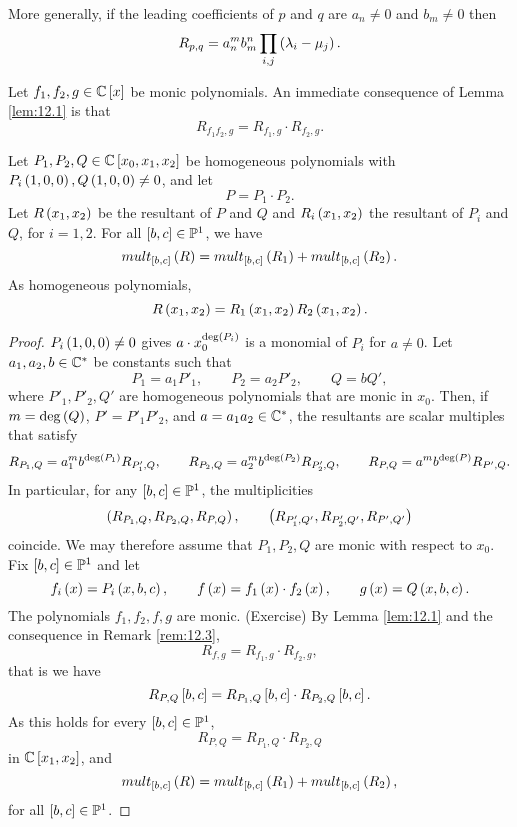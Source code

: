 \begin{remark}
More generally, if the leading coefficients of $ p $ and $ q $ are $ a_n \ne 0 $ and $ b_m \ne 0 $ then
$$ R_{p, q} = a_n^mb_m^n\prod_{i, j} \rb{\lambda_i - \mu_j}. $$
\end{remark}

\begin{remark}
\label{rem:12.3}
Let $ f_1, f_2, g \in \C\sb{x} $ be monic polynomials. An immediate consequence of Lemma \ref{lem:12.1} is that
$$ R_{f_1f_2, g} = R_{f_1, g} \cdot R_{f_2, g}. $$
\end{remark}

\pagebreak

\begin{lemma}
\label{lem:12.4}
Let $ P_1, P_2, Q \in \C\sb{x_0, x_1, x_2} $ be homogeneous polynomials with $ P_i\rb{1, 0, 0}, Q\rb{1, 0, 0} \ne 0 $, and let
$$ P = P_1 \cdot P_2. $$
Let $ R\rb{x_1, x_2} $ be the resultant of $ P $ and $ Q $ and $ R_i\rb{x_1, x_2} $ the resultant of $ P_i $ and $ Q $, for $ i = 1, 2 $. For all $ \sb{b, c} \in \P^1 $, we have
$$ mult_{\sb{b, c}}\rb{R} = mult_{\sb{b, c}}\rb{R_1} + mult_{\sb{b, c}}\rb{R_2}. $$
As homogeneous polynomials,
$$ R\rb{x_1, x_2} = R_1\rb{x_1, x_2}R_2\rb{x_1, x_2}. $$
\end{lemma}

\begin{proof}
$ P_i\rb{1, 0, 0} \ne 0 $ gives $ a \cdot x_0^{\deg\rb{P_i}} $ is a monomial of $ P_i $ for $ a \ne 0 $. Let $ a_1, a_2, b \in \C^* $ be constants such that
$$ P_1 = a_1P'_1, \qquad P_2 = a_2P'_2, \qquad Q = bQ', $$
where $ P'_1, P'_2, Q' $ are homogeneous polynomials that are monic in $ x_0 $. Then, if $ m = \deg\rb{Q} $, $ P' = P'_1P'_2 $, and $ a = a_1a_2 \in \C^* $, the resultants are scalar multiples that satisfy
$$ R_{P_1, Q} = a_1^mb^{\deg\rb{P_1}}R_{P'_1, Q}, \qquad R_{P_2, Q} = a_2^mb^{\deg\rb{P_2}}R_{P'_2, Q}, \qquad R_{P, Q} = a^mb^{\deg\rb{P}}R_{P', Q}. $$
In particular, for any $ \sb{b, c} \in \P^1 $, the multiplicities
$$ \rb{R_{P_1, Q}, R_{P_2, Q}, R_{P, Q}}, \qquad \rb{R_{P'_1, Q'}, R_{P'_2, Q'}, R_{P', Q'}} $$
coincide. We may therefore assume that $ P_1, P_2, Q $ are monic with respect to $ x_0 $. Fix $ \sb{b, c} \in \P^1 $ and let
$$ f_i\rb{x} = P_i\rb{x, b, c}, \qquad f\rb{x} = f_1\rb{x} \cdot f_2\rb{x}, \qquad g\rb{x} = Q\rb{x, b, c}. $$
The polynomials $ f_1, f_2, f, g $ are monic. (Exercise) By Lemma \ref{lem:12.1} and the consequence in Remark \ref{rem:12.3},
$$ R_{f, g} = R_{f_1, g} \cdot R_{f_2, g}, $$
that is we have
$$ R_{P, Q}\sb{b, c} = R_{P_1, Q}\sb{b, c} \cdot R_{P_2, Q}\sb{b, c}. $$
As this holds for every $ \sb{b, c} \in \P^1 $,
$$ R_{P, Q} =  R_{P_1, Q} \cdot R_{P_2, Q} $$
in $ \C\sb{x_1, x_2} $, and
$$ mult_{\sb{b, c}}\rb{R} = mult_{\sb{b, c}}\rb{R_1} + mult_{\sb{b, c}}\rb{R_2}, $$
for all $ \sb{b, c} \in \P^1 $.
\end{proof}

